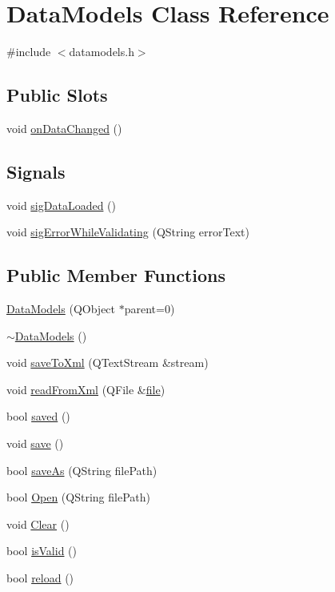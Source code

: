 \hypertarget{class_data_models}{
\section{DataModels Class Reference}
\label{class_data_models}
}


{\ttfamily \#include $<$datamodels.h$>$}

\subsection*{Public Slots}
\begin{DoxyCompactItemize}
\item 
void \hyperlink{class_data_models_a7192565be8c6f67c9a0f3fb504f2fbe5}{onDataChanged} ()
\end{DoxyCompactItemize}
\subsection*{Signals}
\begin{DoxyCompactItemize}
\item 
void \hyperlink{class_data_models_aadcd4b8ed767c4e20bd4cdb3ac57f089}{sigDataLoaded} ()
\item 
void \hyperlink{class_data_models_a201ee8216f42649d1932122eca5c4805}{sigErrorWhileValidating} (QString errorText)
\end{DoxyCompactItemize}
\subsection*{Public Member Functions}
\begin{DoxyCompactItemize}
\item 
\hyperlink{class_data_models_ae0aab1d21aeab9c961530e560169c642}{DataModels} (QObject $\ast$parent=0)
\item 
\hyperlink{class_data_models_a3b882662284fa9a80079b58af6b3bbaa}{$\sim$DataModels} ()
\item 
void \hyperlink{class_data_models_ace1a19056a0ffedfe69e5f66fbee8c76}{saveToXml} (QTextStream \&stream)
\item 
void \hyperlink{class_data_models_aacbbbcfba17d803ee512be53f0b0a975}{readFromXml} (QFile \&\hyperlink{class_data_models_a85d5d5ca7979b7cea35b9f335ac3faa1}{file})
\item 
bool \hyperlink{class_data_models_ac3e7518135acf8a661bc556e1c0e4a07}{saved} ()
\item 
void \hyperlink{class_data_models_a5cceb6568900ae6dfee08f83fc1236cd}{save} ()
\item 
bool \hyperlink{class_data_models_a7f50837ecf7c2cf2b7c204b117f75f94}{saveAs} (QString filePath)
\item 
bool \hyperlink{class_data_models_adda2c58f7ca91f77a72e2e702a0862a8}{Open} (QString filePath)
\item 
void \hyperlink{class_data_models_ac02d11c6b901260535273af9b2f7f094}{Clear} ()
\item 
bool \hyperlink{class_data_models_a44bf14cc7c7b58521f44a906522ac09d}{isValid} ()
\item 
bool \hyperlink{class_data_models_a6f54d86f8405af37d36da91cec9d4ea2}{reload} ()
\end{DoxyCompactItemize}

